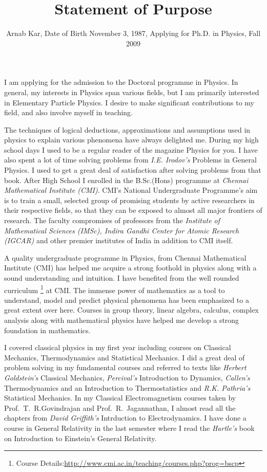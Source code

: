 \documentclass[12pt,a4paper,oneside]{amsart}
\title{Statement of Purpose}
\author{\small{Arnab Kar, Date of Birth November 3, 1987, Applying for Ph.D. in Physics, Fall 2009}}
\begin{document}
\maketitle
\fancyhead{}
\fancyfoot{}

\cfoot{\thepage}

I am applying for the admission to the Doctoral programme in Physics. In general, my interests in Physics span various fields, but I am primarily interested in Elementary Particle Physics. I desire to make significant contributions to my field, and also involve myself in teaching.

The techniques of logical deductions, approximations and assumptions used in physics to explain various phenomena have always delighted me. During my high school days I used to be a regular reader of the magazine Physics for you. I have also spent a lot of time solving problems from \textit{I.E. Irodov's} Problems in General Physics. I used to get a great deal of satisfaction after solving problems from that book. After High School I enrolled in the B.Sc.(Hons) programme at \textit{Chennai Mathematical Institute (CMI)}. CMI's National Undergraduate Programme's aim is to train a small, selected group of promising students by active researchers in their respective fields, so that they can be exposed to almost all major frontiers of research. The faculty compromises of professors from the \textit{Institute of Mathematical Sciences (IMSc), Indira Gandhi Center for Atomic Research (IGCAR)} and other premier institutes of India in addition to CMI itself.

A quality undergraduate programme in Physics, from Chennai Mathematical Institute (CMI) has helped me acquire a strong foothold in physics along with a sound understanding and intuition. I have benefited from the well rounded curriculum \footnote{Course Details:\url{http://www.cmi.ac.in/teaching/courses.php?prog=bscp}} at CMI. The immense power of mathematics as a tool to understand, model and predict physical phenomena has been emphasized to a great extent over here. Courses in group theory, linear algebra, calculus, complex analysis along with mathematical physics have helped me develop a strong foundation in mathematics. 

I covered classical physics in my first year including courses on Classical Mechanics, Thermodynamics and Statistical Mechanics. I did a great deal of problem solving in my fundamental courses and referred to texts like \textit{Herbert Goldstein's} Classical Mechanics, \textit{Percival's} Introduction to Dynamics, \textit{Callen's} Thermodynamics and an Introduction to Thermostatistics and \textit{R.K. Pathria's} Statistical Mechanics. In my Classical Electromagnetism courses taken by Prof.~T.~R.Govindrajan and Prof.~R.~Jagannathan,  I almost read all the chapters from \textit{David Griffith's} Intrduction to Electrodynamics. I have done a course in General Relativity in the last semester where I read the \textit{Hartle's} book on Introduction to Einstein's General Relativity. 
\end{document}
